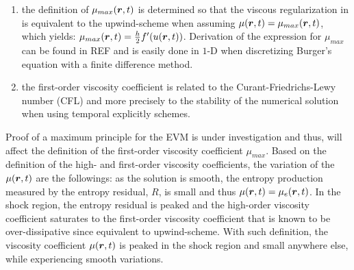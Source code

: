 \begin{enumerate}
\item the definition of $\mu_{max}(\boldsymbol r,t)$ is determined so that the viscous regularization in  is equivalent to the upwind-scheme when assuming $\mu(\boldsymbol r,t) = \mu_{max}(\boldsymbol r,t)$, which yields: $\mu_{max}(\boldsymbol r,t) = \frac{h}{2} f'(u(\boldsymbol r,t))$. Derivation of the expression for $\mu_{max}$ can be found in REF and is easily done in $1$-D when discretizing Burger's equation with a finite difference method. 
\item the first-order viscosity coefficient is related to the Curant-Friedrichs-Lewy number (CFL) and more precisely to the stability of the numerical solution when using temporal explicitly schemes.
\end{enumerate}
Proof of a maximum principle for the EVM is under investigation and thus, will affect the definition of the first-order viscosity coefficient $\mu_{max}$. Based on the definition of the high- and first-order viscosity coefficients, the variation of the $\mu(\boldsymbol r,t)$ are the followings: as the solution is smooth, the entropy production measured by the entropy residual, $R$, is small and thus $\mu(\boldsymbol r,t) = \mu_e(\boldsymbol r,t)$. In the shock region, the entropy residual is peaked and the high-order viscosity coefficient saturates to the first-order viscosity coefficient that is known to be over-dissipative since equivalent to upwind-scheme. With such definition, the viscosity coefficient $\mu(\boldsymbol r,t)$ is peaked in the shock region and small anywhere else, while experiencing smooth variations. 

